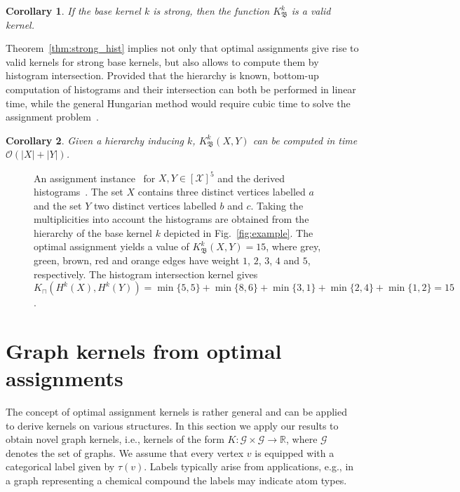 \documentclass{article}
\newtheorem{corollary}{Corollary}
\newcommand{\lab}[0]{\tau}
\newcommand{\X}{\ensuremath{\mathcal{X}}\xspace}
\newcommand{\G}{\ensuremath{\mathcal{G}}\xspace}
\newcommand{\bbR}[0]{\ensuremath{\mathbb{R}}\xspace}
\newcommand{\Assign}{\ensuremath{\mathfrak{B}}\xspace}
\begin{document}
\begin{corollary}\label{cor:strong_valid}
 If the base kernel $k$ is strong, then the function $K_\Assign^k$ is a valid kernel.
\end{corollary}

Theorem~\ref{thm:strong_hist} implies not only that optimal assignments give
rise to valid kernels for strong base kernels, but also allows to compute 
them by histogram intersection. Provided that the hierarchy is known, bottom-up 
computation of histograms and their intersection can both be performed in linear 
time, while the general Hungarian method would require cubic time to solve the 
assignment problem~\cite{Burkard2012}.

\begin{corollary}
 Given a hierarchy inducing $k$, $K_\Assign^k(X,Y)$ can be computed in time 
 $\mathcal{O}(|X|+|Y|)$.
\end{corollary}


\begin{figure}
  \centering
  \null\hfill
  \hfill
  \hfill\null
  \caption{
    An assignment instance~ for 
    $X,Y \in [\X]^5$ and the derived histograms~.
    The set $X$ contains three distinct vertices labelled $a$ and the set $Y$ two
    distinct vertices labelled $b$ and $c$. Taking the multiplicities into account 
    the histograms are obtained from the hierarchy of the base kernel $k$ depicted in Fig.~\ref{fig:example}.
    The optimal assignment yields a value of $K_\Assign^k(X,Y)=15$, where grey,
    green, brown, red and orange edges have weight $1$, $2$, $3$, $4$ and $5$, 
    respectively.
    The histogram intersection kernel gives
    $K_\sqcap(H^k(X),H^k(Y))= \min\{5,5\}+\min\{8,6\}+\min\{3,1\}+\min\{2,4\}+\min\{1,2\}=15$.       
  }
  \label{fig:example:hist}
\end{figure}


\section{Graph kernels from optimal assignments}
The concept of optimal assignment kernels is rather general and can be applied
to derive kernels on various structures.
In this section we apply our results to obtain novel graph kernels, i.e., kernels
of the form $K : \G \times \G \to \bbR$, where \G denotes the set of graphs.
We assume that every vertex $v$ is equipped with a categorical label given by $\lab(v)$. 
Labels typically arise from applications, e.g., in a graph representing a chemical 
compound the labels may indicate atom types.
\end{document}
